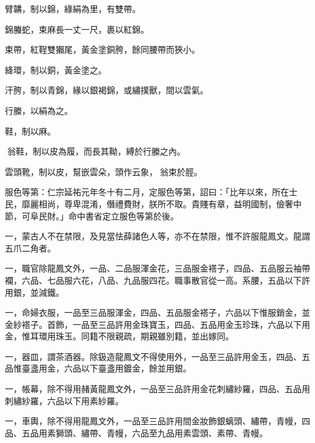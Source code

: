 \begin{pinyinscope}
 臂韝，制以錦，綠絹為里，有雙帶。



 錦螣蛇，束麻長一丈一尺，裹以紅錦。



 束帶，紅鞓雙獺尾，黃金塗銅胯，餘同腰帶而狹小。



 絳環，制以銅，黃金塗之。



 汗胯，制以青錦，緣以銀褐錦，或繡撲獸，間以雲氣。



 行縢，以絹為之。



 鞋，制以麻。



 翁鞋，制以皮為履，而長其靿，縛於行縢之內。



 雲頭靴，制以皮，幫嵌雲朵，頭作云象，翁束於脛。



 服色等第：仁宗延祐元年冬十有二月，定服色等第，詔曰：「比年以來，所在士民，靡麗相尚，尊卑混淆，僭禮費財，朕所不取。貴賤有章，益明國制，儉奢中節，可阜民財。」命中書省定立服色等第於後。



 一，蒙古人不在禁限，及見當怯薛諸色人等，亦不在禁限，惟不許服龍鳳文。龍謂五爪二角者。



 一，職官除龍鳳文外，一品、二品服渾金花，三品服金褡子，四品、五品服云袖帶襴，六品、七品服六花，八品、九品服四花。職事散官從一高。系腰，五品以下許用銀，並減鐵。



 一，命婦衣服，一品至三品服渾金，四品、五品服金褡子，六品以下惟服銷金，並金紗褡子。首飾，一品至三品許用金珠寶玉，四品、五品用金玉珍珠，六品以下用金，惟耳環用珠玉。同籍不限親疏，期親雖別籍，並出嫁同。



 一，器皿，謂茶酒器。除鈒造龍鳳文不得使用外，一品至三品許用金玉，四品、五品惟臺盞用金，六品以下臺盞用鍍金，餘並用銀。



 一，帳幕，除不得用赭黃龍鳳文外，一品至三品許用金花刺繡紗羅，四品、五品用刺繡紗羅，六品以下用素紗羅。



 一，車輿，除不得用龍鳳文外，一品至三品許用間金妝飾銀螭頭、繡帶，青幔，四品、五品用素獅頭、繡帶、青幔，六品至九品用素雲頭、素帶、青幔。




\end{pinyinscope}
